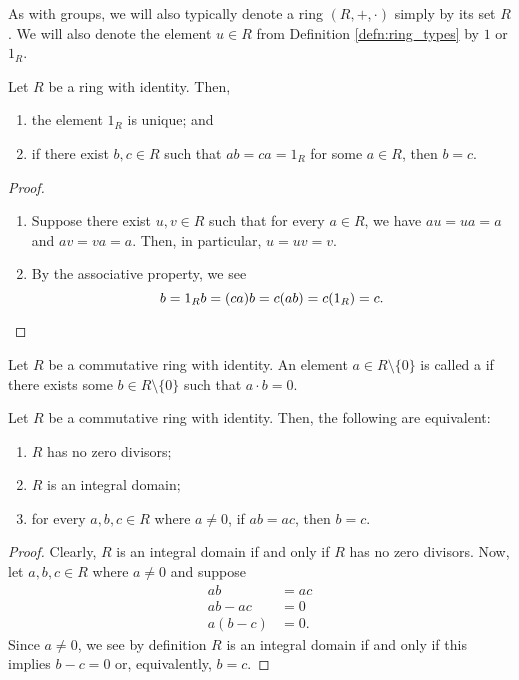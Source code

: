 As with groups, we will also typically denote a ring $ (R,+,\cdot) $ simply by its set $ R $. We will also denote the element $ u\in R $ from Definition \ref{defn:ring_types} by $ 1 $ or $ 1_R $.

\begin{prop}
Let $ R $ be a ring with identity. Then,
\begin{enumerate}
    \item the element $ 1_R $ is unique; and
    \item if there exist $ b,c\in R $ such that $ ab=ca=1_R $ for some $ a\in R $, then $ b=c $.
\end{enumerate}
\end{prop}
\begin{proof}~
\begin{enumerate}
    \item Suppose there exist $ u,v\in R $ such that for every $ a\in R $, we have $ au=ua=a $ and $ av=va=a $. Then, in particular, $ u=uv=v $.

    \item By the associative property, we see
    \begin{equation*}
        b=1_Rb=(ca)b=c(ab)=c(1_R)=c.\qedhere
    \end{equation*}
\end{enumerate}
\end{proof}

\begin{defn}
Let $ R $ be a commutative ring with identity. An element $ a\in R\setminus\{0\} $ is called a  if there exists some $ b\in R\setminus\{0\} $ such that $ a\cdot b=0 $.
\end{defn}

\begin{prop}
Let $ R $ be a commutative ring with identity. Then, the following are equivalent:
\begin{enumerate}
    \item $ R $ has no zero divisors;
    \item $ R $ is an integral domain;
    \item for every $ a,b,c\in R $ where $ a\neq 0 $, if $ ab=ac $, then $ b=c $.
\end{enumerate}
\end{prop}
\begin{proof}
Clearly, $ R $ is an integral domain if and only if $ R $ has no zero divisors. Now, let $ a,b,c\in R $ where $ a\neq 0 $ and suppose
\begin{align*}
    ab &= ac \\
    ab-ac &= 0 \\
    a(b-c) &= 0.
\end{align*}
Since $ a\neq 0 $, we see by definition $ R $ is an integral domain if and only if this implies $ b-c=0 $ or, equivalently, $ b=c $.
\end{proof}

